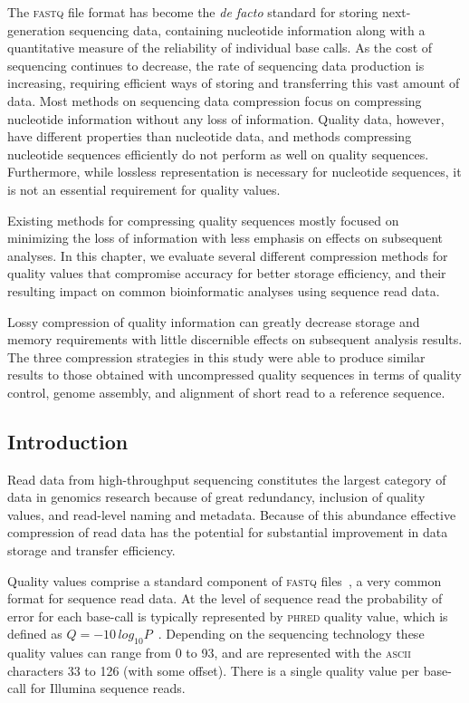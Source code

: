 \documentclass[12pt,\mydriver]{thesis}
\begin{document}
The \textsc{fastq} file format has become the \emph{de facto} standard
for storing next-generation sequencing data, containing nucleotide
information along with a quantitative measure of the reliability of
individual base calls. As the cost of sequencing continues to
decrease, the rate of sequencing data production is increasing,
requiring efficient ways of storing and transferring this vast amount
of data. Most methods on sequencing data compression focus on
compressing nucleotide information without any loss of information.
Quality data, however, have different properties than nucleotide data,
and methods compressing nucleotide sequences efficiently do not
perform as well on quality sequences. Furthermore, while lossless
representation is necessary for nucleotide sequences, it is not an
essential requirement for quality values.

Existing methods for compressing quality sequences mostly focused on
minimizing the loss of information with less emphasis on effects on
subsequent analyses. In this chapter, we evaluate several different
compression methods for quality values that compromise accuracy for
better storage efficiency, and their resulting impact on common
bioinformatic analyses using sequence read data.

Lossy compression of quality information can greatly decrease storage
and memory requirements with little discernible effects on subsequent
analysis results. The three compression strategies in this study were
able to produce similar results to those obtained with uncompressed
quality sequences in terms of quality control, genome assembly, and
alignment of short read to a reference sequence.

\subsection{Introduction}

Read data from high-throughput sequencing constitutes the largest
category of data in genomics research because of great redundancy,
inclusion of quality values, and read-level naming and
metadata. Because of this abundance effective compression of read data
has the potential for substantial improvement in data storage and
transfer efficiency.

Quality values comprise a standard component of \textsc{fastq}
files~\cite{Cock:2010ve}, a very common format for sequence read
data. At the level of sequence read the probability of error for each
base-call is typically represented by \textsc{phred} quality value,
which is defined as $Q =
-10\,log_{10}P$~\cite{Ewing:1998ly}. Depending on the sequencing
technology these quality values can range from 0 to 93, and are
represented with the \textsc{ascii} characters 33 to 126 (with some
offset). There is a single quality value per base-call for Illumina
sequence reads.
\end{document}
